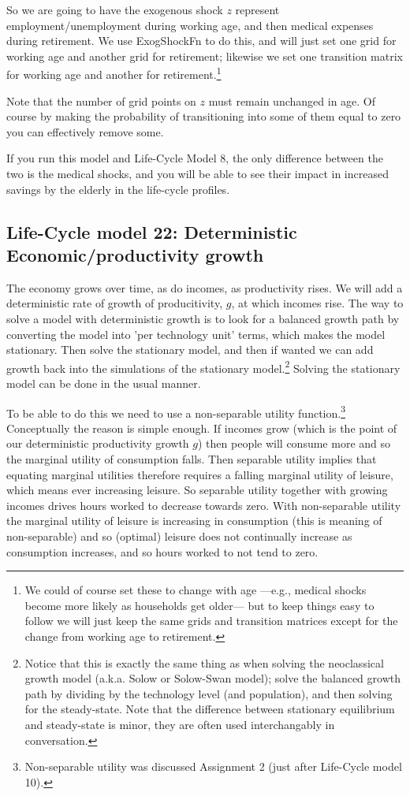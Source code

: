 So we are going to have the exogenous shock $z$ represent employment/unemployment during working age, and then medical expenses during retirement. We use ExogShockFn to do this, and will just set one grid for working age and another grid for retirement; likewise we set one transition matrix for working age and another for retirement.\footnote{We could of course set these to change with age ---e.g., medical shocks become more likely as households get older--- but to keep things easy to follow we will just keep the same grids and transition matrices except for the change from working age to retirement.}

Note that the number of grid points on $z$ must remain unchanged in age. Of course by making the probability of transitioning into some of them equal to zero you can effectively remove some.

If you run this model and Life-Cycle Model 8, the only difference between the two is the medical shocks, and you will be able to see their impact in increased savings by the elderly in the life-cycle profiles.

\subsection{Life-Cycle model 22: Deterministic Economic/productivity growth}
The economy grows over time, as do incomes, as productivity rises. We will add a deterministic rate of growth of producitivity, $g$, at which incomes rise. The way to solve a model with deterministic growth is to look for a balanced growth path by converting the model into 'per technology unit' terms, which makes the model stationary. Then solve the stationary model, and then if wanted we can add growth back into the simulations of the stationary model.\footnote{Notice that this is exactly the same thing as when solving the neoclassical growth model (a.k.a. Solow or Solow-Swan model); solve the balanced growth path by dividing by the technology level (and population), and then solving for the steady-state. Note that the difference between stationary equilibrium and steady-state is minor, they are often used interchangably in conversation.} Solving the stationary model can be done in the usual manner.

To be able to do this we need to use a non-separable utility function.\footnote{Non-separable utility was discussed Assignment 2 (just after Life-Cycle model 10).} Conceptually the reason is simple enough. If incomes grow (which is the point of our deterministic productivity growth $g$) then people will consume more and so the marginal utility of consumption falls. Then separable utility implies that equating marginal utilities therefore requires a falling marginal utility of leisure, which means ever increasing leisure. So separable utility together with growing incomes drives hours worked to decrease towards zero. With non-separable utility the marginal utility of leisure is increasing in consumption (this is meaning of non-separable) and so (optimal) leisure does not continually increase as consumption increases, and so hours worked to not tend to zero.

